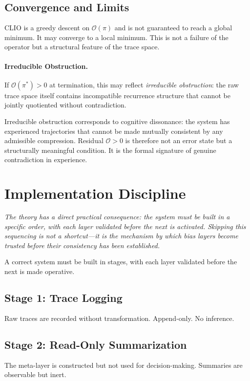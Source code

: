 \documentclass[12pt,a4paper]{article}
\begin{document}
\subsection{Convergence and Limits}

CLIO is a greedy descent on $\mathcal{O}(\pi)$ and is not guaranteed to reach a global minimum. It may converge to a local minimum. This is not a failure of the operator but a structural feature of the trace space.

\paragraph{Irreducible Obstruction.}
If $\mathcal{O}(\pi^*) > 0$ at termination, this may reflect \emph{irreducible obstruction}: the raw trace space itself contains incompatible recurrence structure that cannot be jointly quotiented without contradiction.

Irreducible obstruction corresponds to cognitive dissonance: the system has experienced trajectories that cannot be made mutually consistent by any admissible compression. Residual $\mathcal{O} > 0$ is therefore not an error state but a structurally meaningful condition. It is the formal signature of genuine contradiction in experience.

\section{Implementation Discipline}
\label{sec:implementation}

\textit{The theory has a direct practical consequence: the system must be built in a specific order, with each layer validated before the next is activated. Skipping this sequencing is not a shortcut---it is the mechanism by which bias layers become trusted before their consistency has been established.}

A correct system must be built in stages, with each layer validated before the next is made operative.

\subsection{Stage 1: Trace Logging}
Raw traces are recorded without transformation. Append-only. No inference.

\subsection{Stage 2: Read-Only Summarization}
The meta-layer is constructed but not used for decision-making. Summaries are observable but inert.
\end{document}
